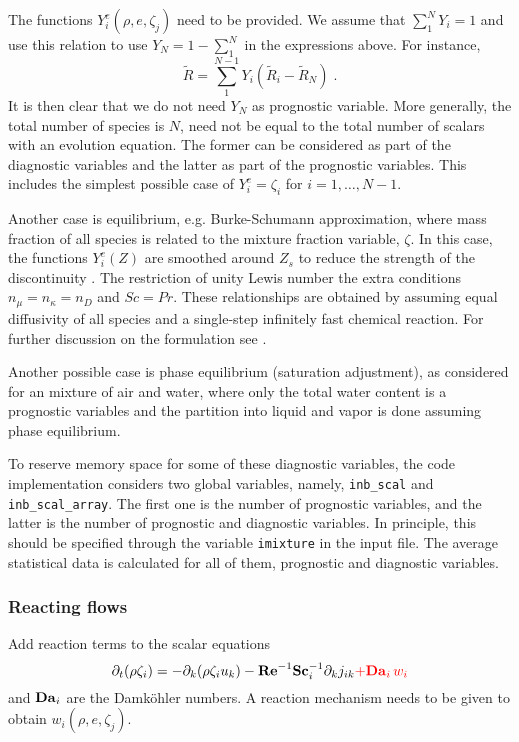 The functions $Y_i^e(\rho,e,\zeta_j)$ need to be provided. We assume that $\sum_1^NY_i=1$ and use this relation to use $Y_N=1-\sum_1^N$ in the expressions above. For instance,
\begin{equation}
    \tilde{R}=\sum_1^{N-1}Y_i(\tilde{R}_i-\tilde{R}_N) \;.
\end{equation}
It is then clear that we do not need $Y_N$ as prognostic variable. More generally, the total number of species is $N$, need not be equal to the total number of scalars with an evolution equation. The former can be considered as part of the diagnostic variables and the latter as part of the prognostic variables. This includes the simplest possible case of $Y_i^e = \zeta_i$ for $i=1,\ldots,N-1$. 

Another case is equilibrium, e.g. Burke-Schumann approximation, where mass fraction of all species is related to the mixture fraction variable, $\zeta$.  In this case, the functions $Y_i^e(Z)$ are smoothed around $Z_s$ to reduce the strength of the discontinuity \citep{Higuera:1994}. The restriction of unity Lewis number the extra conditions $n_\mu=n_\kappa=n_D$ and $Sc=Pr$. These relationships are obtained by assuming equal diffusivity of all species and a single-step infinitely fast chemical reaction.  For further discussion on the formulation see \cite{Williams:1985}.

Another possible case is phase equilibrium (saturation adjustment), as considered for an mixture of air and water, where only the total water content is a prognostic variables and the partition into liquid and vapor is done assuming phase equilibrium. 

To reserve memory space for some of these diagnostic variables, the code implementation considers two global variables, namely, {\tt inb\_scal} and {\tt inb\_scal\_array}. The first one is the number of prognostic variables, and the latter is the number of prognostic and diagnostic variables. In principle, this should be specified through the variable {\tt imixture} in the input file. The average statistical data is calculated for all of them, prognostic and diagnostic variables.

\subsubsection{Reacting flows}

Add reaction terms to the scalar equations
\begin{equation}
    \partial_t (\rho \zeta_i)= -\partial_k (\rho \zeta_i u_k)
    - \mathrm{\bf Re}^{-1}\mathrm{\bf Sc}_i^{-1} \partial_k j_{ik} \color{red}{+\mathrm{\bf Da}_i\,w_i}
\end{equation}
and $\mathrm{\bf Da}_i$ are the Damk{\"o}hler numbers. A reaction mechanism needs to be given to obtain $w_i(\rho,e,\zeta_j)$.

